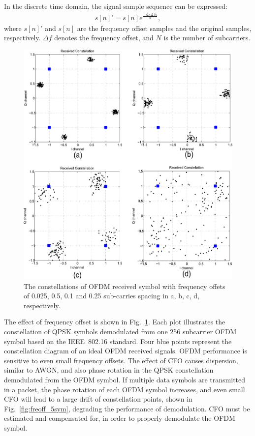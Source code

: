 In the discrete time domain, the signal sample sequence can be expressed:
\begin{eqnarray}
\label{equ:}
            s[n]' = s[n] e^{\frac{− i2\pi \Delta fn}{N}},
\end{eqnarray}
where $s[n]'$ and $s[n]$ are the frequency offset samples and the original samples, respectively.
$\Delta f$ denotes the frequency offset, and $N$ is the number of subcarriers.
\begin{figure}
	\centerline{\includegraphics [width=0.8\columnwidth] {Figures/freoff_1sym.pdf} }
	\caption{The constellations of OFDM received symbol with frequency offets of 0.025, 0.5, 0.1 and 0.25 sub-carries spacing in a, b, c, d, respectively.}
	\label{fig:freoff_1sym}
\end{figure}
The effect of frequency offset is shown in Fig.~\ref{fig:freoff_1sym}. Each plot illustrates the constellation of QPSK symbols demodulated from one 256 subcarrier OFDM symbol based on the IEEE~802.16 standard.
Four blue points represent the constellation diagram of an ideal OFDM received signals.
OFDM performance is sensitive to even small frequency offsets.
The effect of CFO causes dispersion, similar to AWGN, and also phase rotation in the QPSK constellation demodulated from the OFDM symbol.
If multiple data symbols are transmitted in a packet, the phase rotation of each OFDM symbol increases, and even small CFO will lead to a large drift of constellation points, shown in Fig.~\ref{fig:freoff_5sym}, degrading the performance of demodulation. CFO must be estimated and compensated for, in order to properly demodulate the OFDM symbol.

